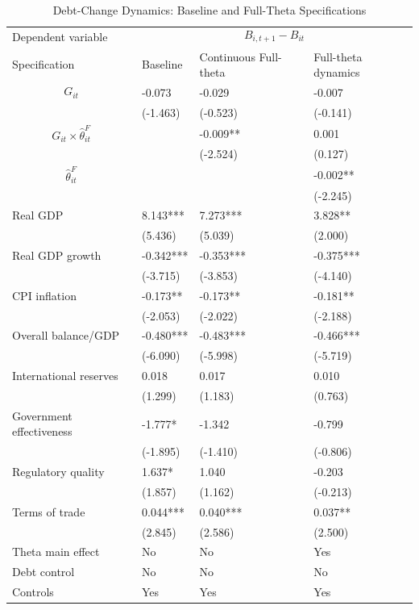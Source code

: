 \begin{table}[H]\centering
\begin{threeparttable}
\caption{Debt-Change Dynamics: Baseline and Full-Theta Specifications}
\label{tab:debt_change_combined_fulltheta}
\scriptsize
\begin{tabularx}{\textwidth}{lYYY}
\toprule
Dependent variable &  \\
\cmidrule(lr){2-4}
Specification & Baseline & Continuous Full-theta & Full-theta dynamics \\
\midrule
$$G_{it}$$ & -0.073 & -0.029 & -0.007 \\
 & (-1.463) & (-0.523) & (-0.141) \\
$$G_{it}\times\widehat{\theta}^{F}_{it}$$ &  & -0.009** & 0.001 \\
 &  & (-2.524) & (0.127) \\
$$\widehat{\theta}^{F}_{it}$$ &  &  & -0.002** \\
 &  &  & (-2.245) \\
Real GDP & 8.143*** & 7.273*** & 3.828** \\
 & (5.436) & (5.039) & (2.000) \\
Real GDP growth & -0.342*** & -0.353*** & -0.375*** \\
 & (-3.715) & (-3.853) & (-4.140) \\
CPI inflation & -0.173** & -0.173** & -0.181** \\
 & (-2.053) & (-2.022) & (-2.188) \\
Overall balance/GDP & -0.480*** & -0.483*** & -0.466*** \\
 & (-6.090) & (-5.998) & (-5.719) \\
International reserves & 0.018 & 0.017 & 0.010 \\
 & (1.299) & (1.183) & (0.763) \\
Government effectiveness & -1.777* & -1.342 & -0.799 \\
 & (-1.895) & (-1.410) & (-0.806) \\
Regulatory quality & 1.637* & 1.040 & -0.203 \\
 & (1.857) & (1.162) & (-0.213) \\
Terms of trade & 0.044*** & 0.040*** & 0.037** \\
 & (2.845) & (2.586) & (2.500) \\
\midrule
Theta main effect & No & No & Yes \\
Debt control & No & No & No \\
Controls & Yes & Yes & Yes \\

\end{tabularx}
\end{threeparttable}
\end{table}
